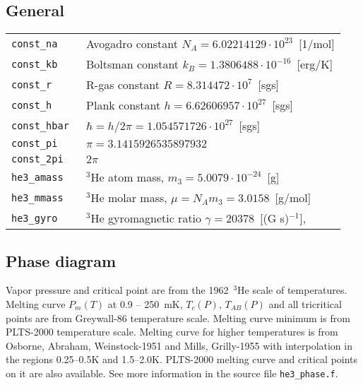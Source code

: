 \documentclass[a4paper]{article}
\begin{document}
\subsection*{General}

\medskip
\noindent\begin{tabular}{lp{11cm}}
\tt const\_na      & Avogadro constant $N_A = 6.02214129 \cdot 10^{23}$~[1/mol]\\
\tt const\_kb      & Boltsman constant $k_B = 1.3806488 \cdot 10^{-16}$~[erg/K]\\
\tt const\_r       & R-gas constant $R = 8.314472 \cdot 10^{7}$~[sgs]\\
\tt const\_h       & Plank constant $h = 6.62606957 \cdot 10^{27}$~[sgs]\\
\tt const\_hbar    & $\hbar = h/2\pi = 1.054571726 \cdot 10^{27}$~[sgs]\\
\tt const\_pi      & $\pi = 3.1415926535897932$\\
\tt const\_2pi     & $2\pi$\\
\tt he3\_amass     & $^3$He atom mass, $m_3 = 5.0079 \cdot 10^{-24}$~[g]\\
\tt he3\_mmass     & $^3$He molar mass, $\mu = N_A m_3 = 3.0158$~[g/mol]\\
\tt he3\_gyro      & $^3$He gyromagnetic ratio $\gamma = 20378$~[(G s)$^{-1}$],\\
\end{tabular}
\medskip

\eject
\subsection*{Phase diagram}

Vapor pressure and critical point are from the {1962~$^3$He scale of
temperatures}. Melting curve $P_m(T)$ at 0.9 -- 250~mK, $T_c(P)$,
$T_{AB}(P)$ and all tricritical points are from {Greywall-86 temperature
scale}. Melting curve minimum is from PLTS-2000 temperature scale.
Melting curve for higher temperatures is from {Osborne, Abraham, Weinstock-1951} and {Mills, Grilly-1955} with
interpolation in the regions 0.25--0.5K and 1.5--2.0K. PLTS-2000 melting
curve and critical points on it are also available. See more information
in the source file {\tt he3\_phase.f}.
\end{document}
